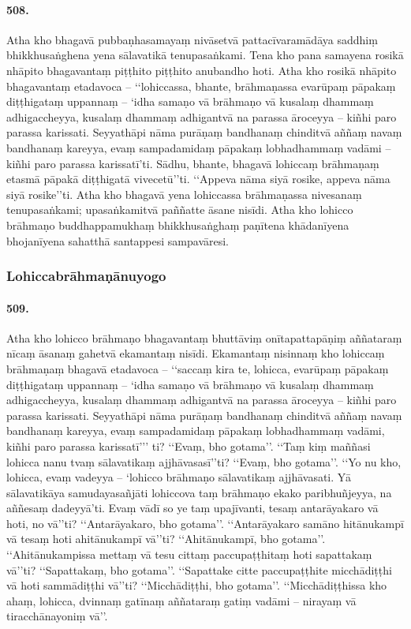 \paragraph{508.} Atha kho bhagavā pubbaṇhasamayaṃ nivāsetvā pattacīvaramādāya saddhiṃ bhikkhusaṅghena yena sālavatikā tenupasaṅkami. Tena kho pana samayena rosikā nhāpito bhagavantaṃ piṭṭhito piṭṭhito anubandho hoti. Atha kho rosikā nhāpito bhagavantaṃ etadavoca – ‘‘lohiccassa, bhante, brāhmaṇassa evarūpaṃ pāpakaṃ diṭṭhigataṃ uppannaṃ – ‘idha samaṇo vā brāhmaṇo vā kusalaṃ dhammaṃ adhigaccheyya, kusalaṃ dhammaṃ adhigantvā na parassa āroceyya – kiñhi paro parassa karissati. Seyyathāpi nāma purāṇaṃ bandhanaṃ chinditvā aññaṃ navaṃ bandhanaṃ kareyya, evaṃ sampadamidaṃ pāpakaṃ lobhadhammaṃ vadāmi – kiñhi paro parassa karissatī’ti. Sādhu, bhante, bhagavā lohiccaṃ brāhmaṇaṃ etasmā pāpakā diṭṭhigatā vivecetū’’ti. ‘‘Appeva nāma siyā rosike, appeva nāma siyā rosike’’ti. Atha kho bhagavā yena lohiccassa brāhmaṇassa nivesanaṃ tenupasaṅkami; upasaṅkamitvā paññatte āsane nisīdi. Atha kho lohicco brāhmaṇo buddhappamukhaṃ bhikkhusaṅghaṃ paṇītena khādanīyena bhojanīyena sahatthā santappesi sampavāresi.

\subsubsection{Lohiccabrāhmaṇānuyogo}

\paragraph{509.} Atha kho lohicco brāhmaṇo bhagavantaṃ bhuttāviṃ onītapattapāṇiṃ aññataraṃ nīcaṃ āsanaṃ gahetvā ekamantaṃ nisīdi. Ekamantaṃ nisinnaṃ kho lohiccaṃ brāhmaṇaṃ bhagavā etadavoca – ‘‘saccaṃ kira te, lohicca, evarūpaṃ pāpakaṃ diṭṭhigataṃ uppannaṃ – ‘idha samaṇo vā brāhmaṇo vā kusalaṃ dhammaṃ adhigaccheyya, kusalaṃ dhammaṃ adhigantvā na parassa āroceyya – kiñhi paro parassa karissati. Seyyathāpi nāma purāṇaṃ bandhanaṃ chinditvā aññaṃ navaṃ bandhanaṃ kareyya, evaṃ sampadamidaṃ pāpakaṃ lobhadhammaṃ vadāmi, kiñhi paro parassa karissatī’’’ ti? ‘‘Evaṃ, bho gotama’’. ‘‘Taṃ kiṃ maññasi lohicca nanu tvaṃ sālavatikaṃ ajjhāvasasī’’ti? ‘‘Evaṃ, bho gotama’’. ‘‘Yo nu kho, lohicca, evaṃ vadeyya – ‘lohicco brāhmaṇo sālavatikaṃ ajjhāvasati. Yā sālavatikāya samudayasañjāti lohiccova taṃ brāhmaṇo ekako paribhuñjeyya, na aññesaṃ dadeyyā’ti. Evaṃ vādī so ye taṃ upajīvanti, tesaṃ antarāyakaro vā hoti, no vā’’ti? ‘‘Antarāyakaro, bho gotama’’. ‘‘Antarāyakaro samāno hitānukampī vā tesaṃ hoti ahitānukampī vā’’ti? ‘‘Ahitānukampī, bho gotama’’. ‘‘Ahitānukampissa mettaṃ vā tesu cittaṃ paccupaṭṭhitaṃ hoti sapattakaṃ vā’’ti? ‘‘Sapattakaṃ, bho gotama’’. ‘‘Sapattake citte paccupaṭṭhite micchādiṭṭhi vā hoti sammādiṭṭhi vā’’ti? ‘‘Micchādiṭṭhi, bho gotama’’. ‘‘Micchādiṭṭhissa kho ahaṃ, lohicca, dvinnaṃ gatīnaṃ aññataraṃ gatiṃ vadāmi – nirayaṃ vā tiracchānayoniṃ vā’’.

